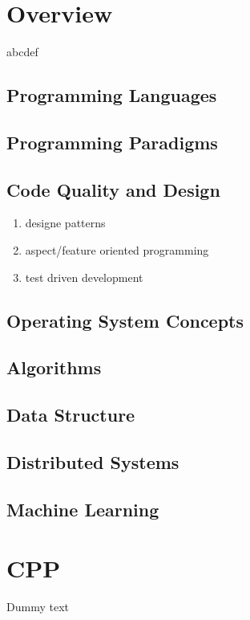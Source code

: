 \documentclass{article}
\begin{document}
\tableofcontents
\newpage

\section{Overview}
abcdef
\subsection{Programming Languages}
\subsection{Programming Paradigms}
\subsection{Code Quality and Design}
\begin{enumerate}
    \item designe patterns
    \item aspect/feature oriented programming
    \item test driven development
\end{enumerate}
\subsection{Operating System Concepts}
\subsection{Algorithms}
\subsection{Data Structure}
\subsection{Distributed Systems}
\subsection{Machine Learning}

\section{CPP}
Dummy text
\end{document}
